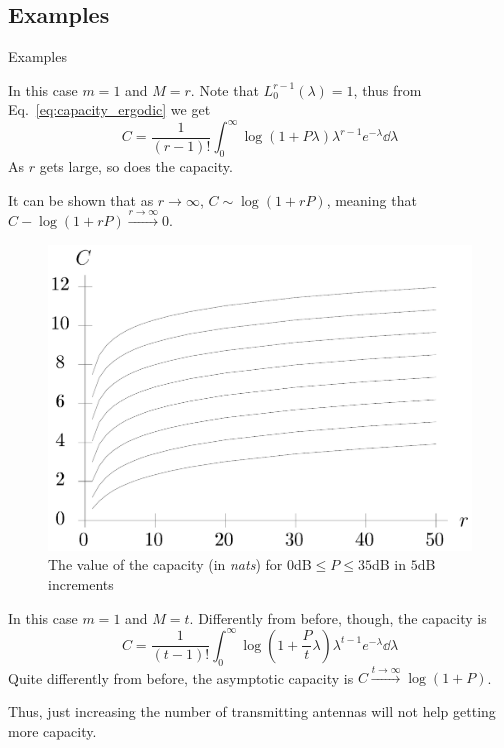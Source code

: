 \subsection{Examples}
\begin{frame}[allowframebreaks]{Examples}

\begin{example}[$t=1$]
	In this case $m=1$ and $M=r$. Note that $L_0^{r-1}(\lambda)=1$, thus from Eq.~\eqref{eq:capacity_ergodic} we get
	$$C = \frac{1}{(r-1)!}
	\int_0^\infty \log(1+P\lambda)
	\lambda^{r-1} e^{-\lambda}
	\dd{\lambda}$$
	As $r$ gets large, so does the capacity.
	
	It can be shown that as $r\rightarrow\infty$, $C \sim \log(1+rP)$, meaning that $C-\log(1+rP) \xrightarrow{r\rightarrow\infty} 0$.
\end{example}

\begin{example}[$t=1$]
\begin{figure}
	\centering
	\includegraphics[width=0.6\linewidth]{img/capacity_t1}
	\caption{The value of the capacity (in \textit{nats}) for $0$dB$\leq P\leq 35$dB in $5$dB increments}
	\label{fig:capacity_t1}
\end{figure}
\end{example}

\begin{example}[$r=1$]
	In this case $m=1$ and $M=t$. Differently from before, though, the capacity is
	$$C = \frac{1}{(t-1)!}
	\int_0^\infty \log(1+\frac{P}{t}\lambda)
	\lambda^{t-1} e^{-\lambda}
	\dd{\lambda}$$
	Quite differently from before, the asymptotic capacity is $C \xrightarrow{t\rightarrow\infty} \log(1+P)$.
	
	Thus, just increasing the number of transmitting antennas will not help getting more capacity.
\end{example}


\end{frame}
